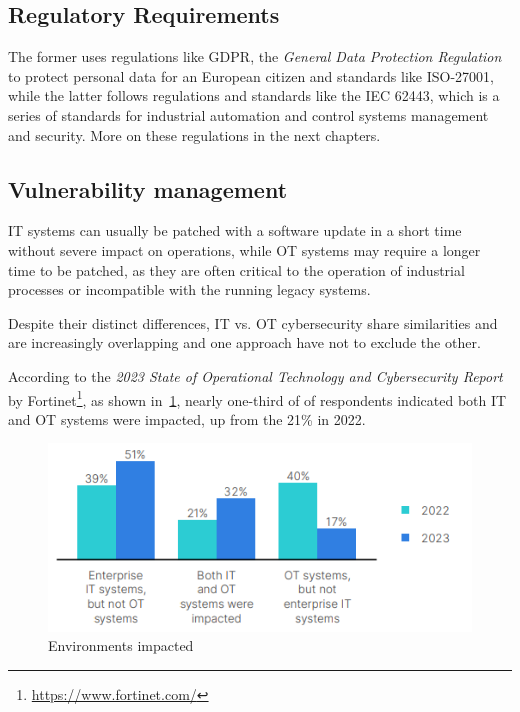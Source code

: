 \subsection{Regulatory Requirements}

The former uses regulations like GDPR, the \textit{General Data Protection Regulation} to protect personal data for an European citizen and standards like ISO-27001, while the latter follows regulations and standards like the IEC 62443, which is a series of standards for industrial automation and control systems management and security. More on these regulations in the next chapters.

\subsection{Vulnerability management}

IT systems can usually be patched with a software update in a short time without severe impact on operations, while OT systems may require a longer time to be patched, as they are often critical to the operation of industrial processes or incompatible with the running legacy systems.


Despite their distinct differences, IT vs. OT cybersecurity share similarities and are increasingly overlapping and one approach have not to exclude the other.

According to the \textit{2023 State of Operational Technology and Cybersecurity Report} by Fortinet\footnote{\url{https://www.fortinet.com/}}, as shown in~\cref{fig:fortinet-intrusions-env-impacted}, nearly one-third of of respondents indicated both IT and OT systems were impacted, up from the 21\% in 2022.

\begin{figure}[h]
  \centering
  \includegraphics[scale=0.8]{chapters/02/assets/fortinet-intrusions-env-impacted.png}
  \caption[Environments impacted]{Environments impacted}
  \label{fig:fortinet-intrusions-env-impacted}
\end{figure}



